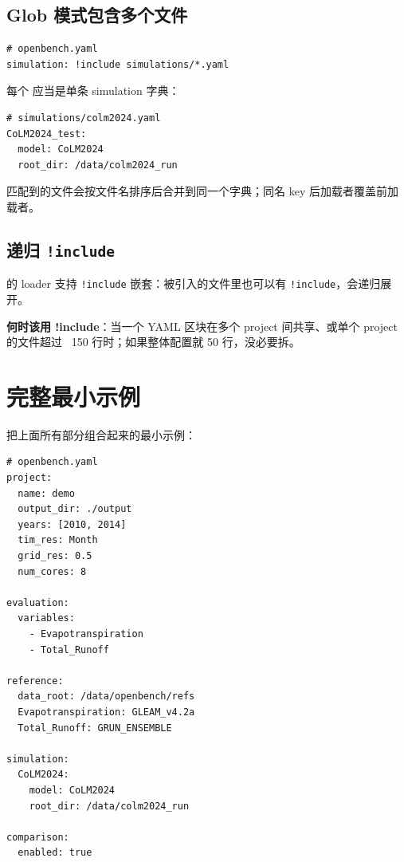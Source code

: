\subsection{Glob 模式包含多个文件}

\begin{verbatim}
# openbench.yaml
simulation: !include simulations/*.yaml
\end{verbatim}

每个  应当是单条 simulation 字典：

\begin{verbatim}
# simulations/colm2024.yaml
CoLM2024_test:
  model: CoLM2024
  root_dir: /data/colm2024_run
\end{verbatim}

匹配到的文件会按文件名排序后合并到同一个字典；同名 key 后加载者覆盖前加载者。

\subsection{递归 \texttt{!include}}

\openbench{} 的 loader 支持 \texttt{!include} 嵌套：被引入的文件里也可以有 \texttt{!include}，会递归展开。

\begin{tipBox}
\textbf{何时该用 !include}：当一个 YAML 区块在多个 project 间共享、或单个 project 的文件超过 ~150 行时；如果整体配置就 50 行，没必要拆。
\end{tipBox}

\section{完整最小示例}

把上面所有部分组合起来的最小示例：

\begin{verbatim}
# openbench.yaml
project:
  name: demo
  output_dir: ./output
  years: [2010, 2014]
  tim_res: Month
  grid_res: 0.5
  num_cores: 8

evaluation:
  variables:
    - Evapotranspiration
    - Total_Runoff

reference:
  data_root: /data/openbench/refs
  Evapotranspiration: GLEAM_v4.2a
  Total_Runoff: GRUN_ENSEMBLE

simulation:
  CoLM2024:
    model: CoLM2024
    root_dir: /data/colm2024_run

comparison:
  enabled: true
\end{verbatim}

